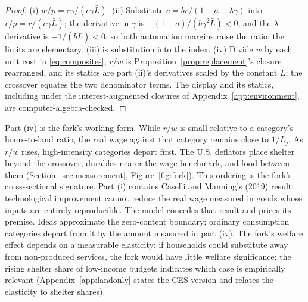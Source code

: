 \documentclass[12pt]{article}
\theoremstyle{plain}
\begin{document}
\begin{proof}
(i) $w/p = c\bar{\gamma}/(c\bar{\gamma}\bar{L})$. (ii) Substitute $c = br/(1-a-\lambda \bar{\gamma})$ into $r/p = r/(c\bar{\gamma}\bar{L})$; the derivative in $\bar{\gamma}$ is $-(1-a)/(b\bar{\gamma}^2\bar{L}) < 0$, and the $\lambda$-derivative is $-1/(b\bar{L}) < 0$, so both automation margins raise the ratio; the limits are elementary. (iii) is substitution into the index. (iv) Divide $w$ by each unit cost in \eqref{eq:composites}; $r/w$ is Proposition~\ref{prop:replacement}'s closure rearranged, and its statics are part (ii)'s derivatives scaled by the constant $\bar{L}$; the crossover equates the two denominator terms. The display and its statics, including under the interest-augmented closures of Appendix~\ref{app:environment}, are computer-algebra-checked.
\end{proof}

Part (iv) is the fork's working form. While $r/w$ is small relative to a category's hours-to-land ratio, the real wage against that category remains close to $1/\bar{L}_j$. As $r/w$ rises, high-intensity categories depart first. The U.S. deflators place shelter beyond the crossover, durables nearer the wage benchmark, and food between them (Section~\ref{sec:measurement}, Figure~\ref{fig:fork}). This ordering is the fork's cross-sectional signature. Part (i) contains Caselli and Manning's (2019) result: technological improvement cannot reduce the real wage measured in goods whose inputs are entirely reproducible. The model concedes that result and prices its premise. Ideas approximate the zero-content boundary; ordinary consumption categories depart from it by the amount measured in part (iv). The fork's welfare effect depends on a measurable elasticity: if households could substitute away from non-produced services, the fork would have little welfare significance; the rising shelter share of low-income budgets indicates which case is empirically relevant (Appendix~\ref{app:landonly} states the CES version and relates the elasticity to shelter shares).
\end{document}
